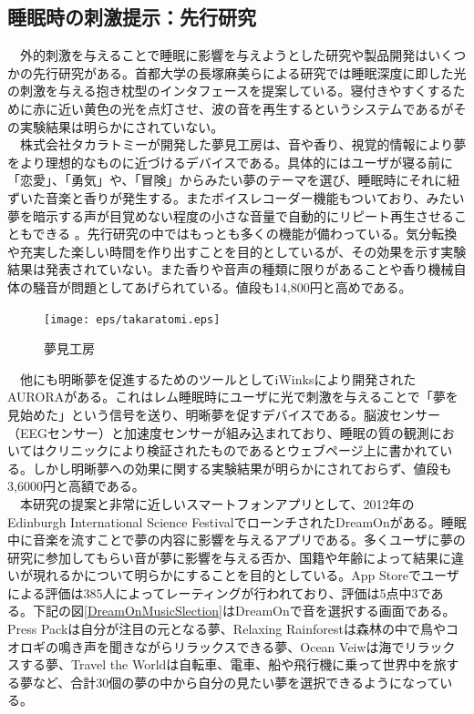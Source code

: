 \subsection{睡眠時の刺激提示：先行研究}
　外的刺激を与えることで睡眠に影響を与えようとした研究や製品開発はいくつかの先行研究がある。首都大学の長塚麻美らによる研究では睡眠深度に即した光の刺激を与える抱き枕型のインタフェースを提案している\cite{sleepSheep}。寝付きやすくするために赤に近い黄色の光を点灯させ、波の音を再生するというシステムであるがその実験結果は明らかにされていない。\\
　株式会社タカラトミーが開発した夢見工房は、音や香り、視覚的情報により夢をより理想的なものに近づけるデバイスである。具体的にはユーザが寝る前に「恋愛」、「勇気」や、「冒険」からみたい夢のテーマを選び、睡眠時にそれに紐ずいた音楽と香りが発生する。またボイスレコーダー機能もついており、みたい夢を暗示する声が目覚めない程度の小さな音量で自動的にリピート再生させることもできる \cite{takaratomi}。先行研究の中ではもっとも多くの機能が備わっている。気分転換や充実した楽しい時間を作り出すことを目的としているが、その効果を示す実験結果は発表されていない。また香りや音声の種類に限りがあることや香り機械自体の騒音が問題としてあげられている。値段も14,800円と高めである。\\
\begin{figure}[htbp]
\begin{center}
\texttt{[image: eps/takaratomi.eps]}
\caption{夢見工房}
\label{takaratomi}
\end{center}
\end{figure}
　他にも明晰夢を促進するためのツールとしてiWinksにより開発されたAURORAがある\cite{iWinks}。これはレム睡眠時にユーザに光で刺激を与えることで「夢を見始めた」という信号を送り、明晰夢を促すデバイスである。脳波センサー（EEGセンサー）と加速度センサーが組み込まれており、睡眠の質の観測においてはクリニックにより検証されたものであるとウェブページ上に書かれている。しかし明晰夢への効果に関する実験結果が明らかにされておらず、値段も3,6000円と高額である。\\
　本研究の提案と非常に近しいスマートフォンアプリとして、2012年のEdinburgh International Science FestivalでローンチされたDreamOnがある\cite{dreamOn}。睡眠中に音楽を流すことで夢の内容に影響を与えるアプリである。多くユーザに夢の研究に参加してもらい音が夢に影響を与える否か、国籍や年齢によって結果に違いが現れるかについて明らかにすることを目的としている。App Storeでユーザによる評価は385人によってレーティングが行われており、評価は5点中3である。下記の図\ref{DreamOnMusicSlection}はDreamOnで音を選択する画面である。Press Packは自分が注目の元となる夢、Relaxing Rainforestは森林の中で鳥やコオロギの鳴き声を聞きながらリラックスできる夢、Ocean Veiwは海でリラックスする夢、Travel the Worldは自転車、電車、船や飛行機に乗って世界中を旅する夢など、合計30個の夢の中から自分の見たい夢を選択できるようになっている。
